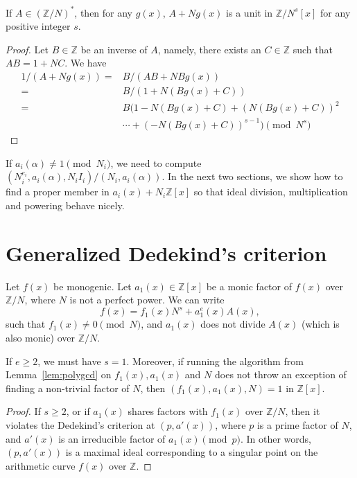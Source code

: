 \documentclass[runningheads, letter]{llncs}
\newcommand{\Z}{{\mathbb Z}}
\begin{document}
\begin{lemma}
  If \( A \in ( \Z/N )^* \), then for any \( g(x) \),
  \( A+N g(x) \) is a unit in \( \Z/N^s [x] \) for
  any positive integer \( s \).
\end{lemma}

\begin{proof}
  Let \( B \in \Z \) be an inverse of \( A \), namely,
  there exists an \( C\in \Z \) such that \( A B = 1 + N C \).
  We have
  \begin{align*}
 1/(A + N g(x)) =& B/ ( A B + N B g(x))\\
    =& B/ ( 1 + N (B g(x) + C) )\\
    =& B ( 1 - N (B g(x) + C) + (N (B g(x) + C))^2 \\
    & \cdots + (- N (B g(x) +C))^{s-1} ) \pmod{N^s }
  \end{align*}
\end{proof}

If \( a_{i}(\alpha) \not= 1 \pmod{N_i} \),
we need to compute
\( (N_i^{e_i}, a_{ i }(\alpha), N_i I_i)/(N_i, a_{i}(\alpha)) \).
%
In the next two sections, we show how to
find a proper member in  \( a_{i} (x) + N_i \Z[x] \) 
so that ideal division, multiplication and powering
behave nicely.

\section{Generalized Dedekind's criterion}
%
\label{sec:dedekind}

Let \( f(x) \) be monogenic.
Let \( a_1(x ) \in \Z[x] \) be a monic factor
of \( f(x) \) over \( \Z/N \), where \( N \) is not a perfect power.
We can write
\begin{equation}\label{eq:1} 
 f(x) = f_1 (x) N^s + a_1^e (x) A(x),  
\end{equation}
such that \( f_1(x) \not= 0 \pmod{N} \), 
and \( a_1(x) \) does not divide \( A(x)\) (which is also monic)
over \(\Z/N \).

\begin{lemma}
\label{lem:gended}
If \( e\geq 2 \), we must have \( s =1 \).
Moreover, if running the algorithm from Lemma~\ref{lem:polygcd}
on \( f_1(x), a_1(x) \)
and \( N \) does not throw an exception of
finding a non-trivial factor of \( N \),
  then \( (f_1(x), a_1(x), N) =1 \) in \( \Z[x] \).
\end{lemma}

\begin{proof}
  If  \( s \geq 2 \), or if \( a_1 (x) \)  shares
  factors with \(  f_1(x) \) over \( \Z/N \),
  then it violates the Dedekind's criterion
\cite[page 31]{GW21}\cite{Dedekind1878}
  at \( (p, a'(x)) \),
  where \( p \) is a prime factor of \( N  \),
  and \( a'(x) \) is an irreducible factor of \( a_1(x) \pmod{p} \). 
  In other words,
  \( (p, a'(x)) \) is a maximal ideal corresponding
  to a singular point on the
  arithmetic curve \( f(x) \) over \( \Z \).  
\end{proof}
\end{document}
